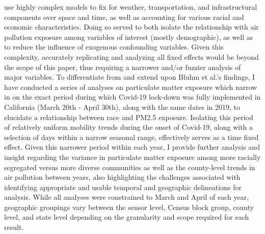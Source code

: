 \documentclass[12pt, ]{article}
\begin{document}
\citet{bluhm_disparate_2022} use highly complex models to fix for
weather, transportation, and infrastructural components over space and
time, as well as accounting for various racial and economic
characteristics. Doing so served to both isolate the relationship with
air pollution exposure among variables of interest (mostly demographic),
as well as to reduce the influence of exogenous confounding variables.
Given this complexity, accurately replicating and analyzing all fixed
effects would be beyond the scope of this paper, thus requiring a
narrower and/or fuzzier analysis of major variables. To differentiate
from and extend upon Bluhm et al.'s findings, I have conducted a series
of analyses on particulate matter exposure which narrow in on the exact
period during which Covid-19 lock-down was fully implemented in
California (March 20th - April 30th), along with the same dates in 2019,
to elucidate a relationship between race and PM2.5 exposure. Isolating
this period of relatively uniform mobility trends during the onset of
Covid-19, along with a selection of days within a narrow seasonal range,
effectively serves as a time fixed effect. Given this narrower period
within each year, I provide further analysis and insight regarding the
variance in particulate matter exposure among more racially segregated
versus more diverse communities as well as the county-level trends in
air pollution between years, also highlighting the challenges associated
with identifying appropriate and usable temporal and geographic
delineations for analysis. While all analyses were constrained to March
and April of each year, geographic groupings vary between the sensor
level, Census block group, county level, and state level depending on
the granularity and scope required for each result.
\end{document}
